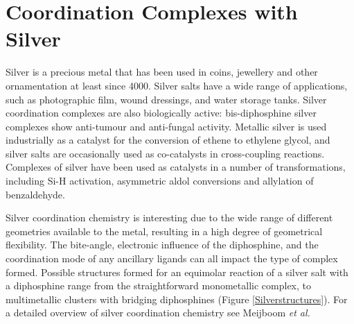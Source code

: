 
\chapter{Coordination Complexes with Silver}
\label{ch:silver}

Silver is a precious metal that has been used in coins, jewellery and other ornamentation at least since 4000\BC.  Silver salts have a wide range of applications, such as photographic film, wound dressings, and water storage tanks.\cite{Enghag2004Ag}  Silver coordination complexes are also biologically active: bis-diphosphine silver complexes show anti-tumour and anti-fungal activity.\cite{Berners-Price1988, Liu2008}  Metallic silver is used industrially as a catalyst for the conversion of ethene to ethylene glycol, and silver salts are occasionally used as co-catalysts in cross-coupling reactions.\cite{Suzuki1999}  Complexes of silver have been used as catalysts in a number of transformations, including Si-H activation,\cite{Iglesias2012} asymmetric aldol conversions \cite{Sawamura1990} and allylation of benzaldehyde\cite{Malaise2006, Yanagisawa1999}.




Silver coordination chemistry is interesting due to the wide range of different geometries available to the metal, resulting in a high degree of geometrical flexibility. The bite-angle, electronic influence of the diphosphine, and the coordination mode of any ancillary ligands can all impact the type of complex formed.  Possible structures formed for an equimolar reaction of a silver salt with a diphosphine range from the straightforward monometallic complex, to multimetallic clusters with bridging diphosphines (Figure \ref{Silverstructures}).  For a detailed overview of silver coordination chemistry see Meijboom \emph{et al.}\cite{Meijboom2009}

